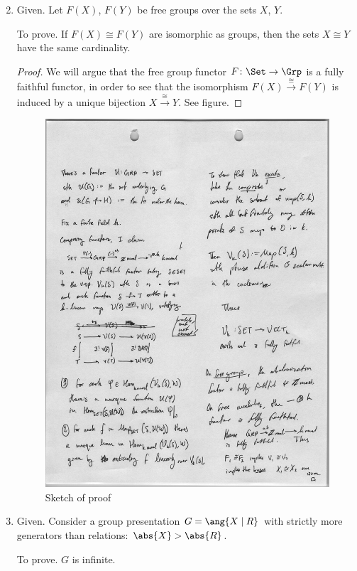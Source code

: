 \documentclass[onesided]{ccg-pset}
\begin{document}
\begin{enumerate}
        \setcounter{enumi}{1}
    \item Given. Let $F(X)$, $F(Y)$ be free groups over the sets $X$, $Y$.

        To prove. If $F(X) \cong F(Y)$ are isomorphic as groups, then the sets $X \cong Y$ have the same cardinality.

\begin{proof}
    We will argue that the free group functor $F \colon \Set \to \Grp$ is a fully faithful functor, in order to see that the isomorphism $F(X) \xrightarrow{\cong} F(Y)$ is induced by a unique bijection $X \xrightarrow{\cong}Y$. See figure.

\end{proof}

    \begin{figure}[htpb]
        \centering
        \includegraphics[width=0.8\linewidth]{20190911T0958.png}
        \caption{Sketch of proof}
        \label{}
    \end{figure}
\item Given. Consider a group presentation $G = \ang{X \mid R}$ with strictly more generators than relations: $\abs{X} > \abs{R}$.

    To prove. $G$ is infinite.


\end{enumerate}
\end{document}
